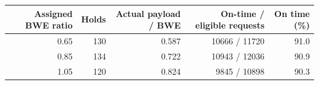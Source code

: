 \begin{tabular}{rrrrr}
\toprule
Assigned BWE ratio & Holds & Actual payload / BWE & On-time / eligible requests & On time (\%) \\
\midrule
0.65 & 130 & 0.587 & 10666 / 11720 & 91.0 \\
0.85 & 134 & 0.722 & 10943 / 12036 & 90.9 \\
1.05 & 120 & 0.824 & 9845 / 10898 & 90.3 \\
\bottomrule
\end{tabular}
